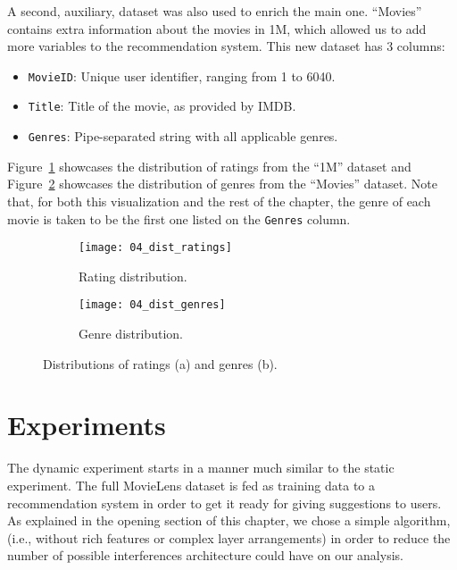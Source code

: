 A second, auxiliary, dataset was also used to enrich the main one. ``Movies''
contains extra information about the movies in 1M, which allowed us to add more
variables to the recommendation system. This new dataset has 3 columns:

\begin{itemize}
  \item \verb|MovieID|: Unique user identifier, ranging from 1 to 6040.
  \item \verb|Title|: Title of the movie, as provided by IMDB.
  \item \verb|Genres|: Pipe-separated string with all applicable genres.
\end{itemize}

Figure~\ref{fig:fig04_dist_ratings} showcases the distribution of ratings from
the ``1M'' dataset and Figure~\ref{fig:fig04_dist_genres} showcases the
distribution of genres from the ``Movies'' dataset. Note that, for both this
visualization and the rest of the chapter, the genre of each movie is taken to
be the first one listed on the \verb|Genres| column.

\begin{figure}
  \centering
  \begin{subfigure}{0.45\textwidth}
    \centering
    \texttt{[image: 04\_dist\_ratings]}
    \caption{Rating distribution.\label{fig:fig04_dist_ratings}}
  \end{subfigure}
  \begin{subfigure}{0.45\textwidth}
    \centering
    \texttt{[image: 04\_dist\_genres]}
    \caption{Genre distribution.\label{fig:fig04_dist_genres}}
  \end{subfigure}
  \caption{Distributions of ratings (a) and genres
  (b).\label{fig:fig04_dist_both}}
\end{figure}

\section{Experiments}
\label{sec:experiments04}

The dynamic experiment starts in a manner much similar to the static experiment.
The full MovieLens dataset is fed as training data to a recommendation system in
order to get it ready for giving suggestions to users. As explained in the
opening section of this chapter, we chose a simple algorithm, (i.e., without
rich features or complex layer arrangements) in order to reduce the number of
possible interferences architecture could have on our analysis.

